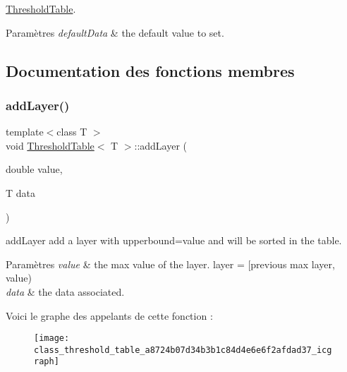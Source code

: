 \hyperlink{class_threshold_table}{Threshold\+Table}. 


\begin{DoxyParams}{Paramètres}
{\em default\+Data} & the default value to set. \\
\hline
\end{DoxyParams}


\subsection{Documentation des fonctions membres}
\mbox{\label{class_threshold_table_a8724b07d34b3b1c84d4e6e6f2afdad37}} 
\subsubsection{\texorpdfstring{add\+Layer()}{addLayer()}\hspace{0.1cm}{\footnotesize\ttfamily [1/2]}}
{\footnotesize\ttfamily template$<$class T $>$ \\
void \hyperlink{class_threshold_table}{Threshold\+Table}$<$ T $>$\+::add\+Layer (\begin{DoxyParamCaption}\item[{double}]{value,  }\item[{T}]{data }\end{DoxyParamCaption})\hspace{0.3cm}{\ttfamily [inline]}}



add\+Layer add a layer with upperbound=value and will be sorted in the table. 


\begin{DoxyParams}{Paramètres}
{\em value} & the max value of the layer. layer = \mbox{[}previous max layer, value) \\
\hline
{\em data} & the data associated. \\
\hline
\end{DoxyParams}
Voici le graphe des appelants de cette fonction \+:
\nopagebreak
\begin{figure}[H]
\begin{center}
\leavevmode
\texttt{[image: class\_threshold\_table\_a8724b07d34b3b1c84d4e6e6f2afdad37\_icgraph]}
\end{center}
\end{figure}
\mbox{\label{class_threshold_table_a0323e0da4f0a97b1b3f84c1d2ae7a5b2}} 
